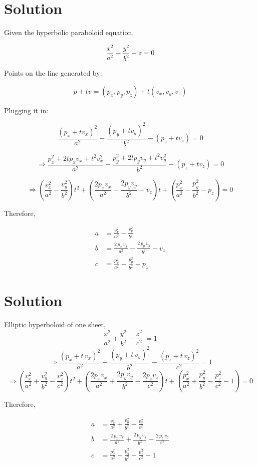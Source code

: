 \documentclass{article}
\begin{document}
\begin{enumerate}
\section*{Solution}

  Given the hyperbolic paraboloid equation,

\[
\frac{x^2}{a^2} - \frac{y^2}{b^2} - z = 0
\]

Points on the line generated by:

\[
p + t v = (p_x, p_y, p_z) + t (v_x, v_y, v_z)
\]

Plugging it in:

\[
\frac{(p_x + t v_x)^2}{a^2} - \frac{(p_y + t v_y)^2}{b^2} - (p_z + t v_z) = 0
\]

\[
\Rightarrow \frac{p_x^2 + 2t p_x v_x + t^2 v_x^2}{a^2} - \frac{p_y^2 + 2t p_y v_y + t^2 v_y^2}{b^2} - (p_z + t v_z) = 0
\]

\[
\Rightarrow \left( \frac{v_x^2}{a^2} - \frac{v_y^2}{b^2} \right)t^2 + \left( \frac{2 p_x v_x}{a^2} - \frac{2 p_y v_y}{b^2} - v_z \right)t + \left( \frac{p_x^2}{a^2} - \frac{p_y^2}{b^2} - p_z \right) = 0
\]

Therefore,

\[
\boxed{
\begin{aligned}
a &= \frac{v_x^2}{a^2} - \frac{v_y^2}{b^2}\\[1mm]
b &= \frac{2\,p_x\,v_x}{a^2} - \frac{2\,p_y\,v_y}{b^2} - v_z\\[1mm]
c &= \frac{p_x^2}{a^2} - \frac{p_y^2}{b^2} - p_z
\end{aligned}
}
\]
\vspace{4cm}

    \section*{Solution}
Elliptic hyperboloid of one sheet, \[\frac{x^2}{a^2} + \frac{y^2}{b^2} - \frac{z^2}{c^2}\ = 1\]
  \[
\Rightarrow\frac{(p_x + t\,v_x)^2}{a^2} + \frac{(p_y + t\,v_y)^2}{b^2} - \frac{(p_z + t\,v_z)^2}{c^2} = 1
\]
\[
\Rightarrow \left( \frac{v_x^2}{a^2} + \frac{v_y^2}{b^2} - \frac{v_z^2}{c^2} \right)t^2 + \left( \frac{2 p_x v_x}{a^2} + \frac{2 p_y v_y}{b^2} - \frac{2 p_z v_z}{c^2} \right)t + \left( \frac{p_x^2}{a^2} + \frac{p_y^2}{b^2} - \frac{p_z^2}{c^2} - 1 \right) = 0
\]

Therefore,

\[
\boxed{
\begin{aligned}
a &= \frac{v_x^2}{a^2} + \frac{v_y^2}{b^2} - \frac{v_z^2}{c^2}\\[1mm]
b &= \frac{2\,p_x\,v_x}{a^2} + \frac{2\,p_y\,v_y}{b^2} - \frac{2\,p_z\,v_z}{c^2}\\[1mm]
c &= \frac{p_x^2}{a^2} + \frac{p_y^2}{b^2} - \frac{p_z^2}{c^2} - 1
\end{aligned}
}
\]
\newpage

\end{enumerate}
\end{document}
